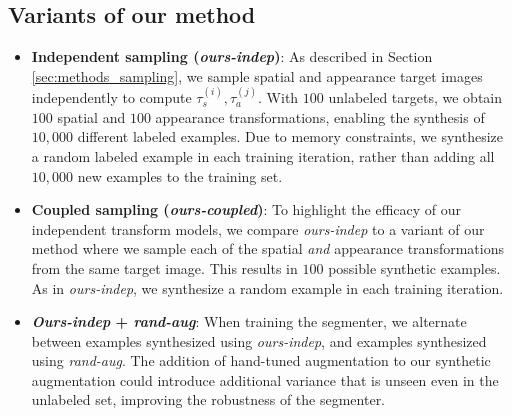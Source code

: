 \documentclass[10pt,twocolumn,letterpaper]{article}
\begin{document}
\subsection{Variants of our method}
\begin{itemize}[leftmargin=-2pt]
\item[] \textbf{Independent sampling (\textit{ours-indep})}: As described in Section \ref{sec:methods_sampling}, we sample spatial and appearance target images independently to compute $\tau^{(i)}_s, \tau^{(j)}_a$. With $100$ unlabeled targets, we obtain $100$ spatial and $100$ appearance transformations, enabling the synthesis of $10,000$ different labeled examples. Due to memory constraints, we synthesize a random labeled example in each training iteration, rather than adding all $10,000$ new examples to the training set.

\item[] \textbf{Coupled sampling (\textit{ours-coupled})}: To highlight the efficacy of our independent transform models, we compare \textit{ours-indep} to a variant of our method where we sample each of the spatial \textit{and} appearance transformations from the same target image. This results in $100$ possible synthetic examples. As in \textit{ours-indep}, we synthesize a random example in each training iteration.

\item[] \textbf{\textit{Ours-indep} + \textit{rand-aug}}: When training the segmenter, we alternate between examples synthesized using \textit{ours-indep}, and examples synthesized using \textit{rand-aug}. The addition of hand-tuned augmentation to our synthetic augmentation could introduce additional variance that is unseen even in the unlabeled set, improving the robustness of the segmenter.
\end{itemize}
\end{document}
